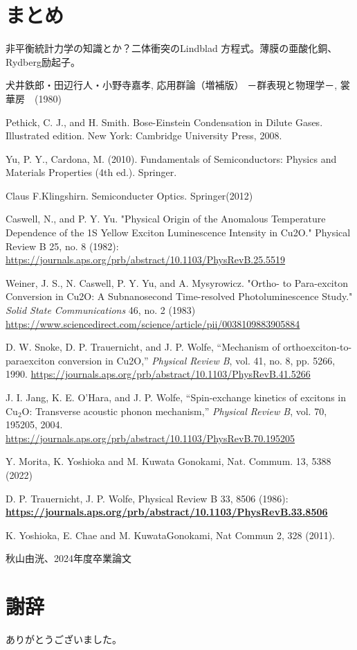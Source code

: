 \newpage
\section{まとめ}
非平衡統計力学の知識とか？二体衝突のLindblad 方程式。薄膜の亜酸化銅、Rydberg励起子。
\newpage


\begin{thebibliography}{9}

犬井鉄郎・田辺行人・小野寺嘉孝, 応用群論（増補版） －群表現と物理学－, 裳華房　(1980)

Pethick, C. J., and H. Smith. Bose-Einstein Condensation in Dilute Gases. Illustrated edition. New York: Cambridge University Press, 2008.

Yu, P. Y.,  Cardona, M. (2010). Fundamentals of Semiconductors: Physics and Materials Properties (4th ed.). Springer.

Claus F.Klingshirn. Semiconducter Optics. Springer(2012)

Caswell, N., and P. Y. Yu. "Physical Origin of the Anomalous Temperature Dependence of the 1S Yellow Exciton Luminescence Intensity in Cu2O." Physical Review B 25, no. 8 (1982): 
\href{https://journals.aps.org/prb/abstract/10.1103/PhysRevB.25.5519}{https://journals.aps.org/prb/abstract/10.1103/PhysRevB.25.5519}

Weiner, J. S., N. Caswell, P. Y. Yu, and A. Mysyrowicz. "Ortho- to Para-exciton Conversion in Cu2O: A Subnanosecond Time-resolved Photoluminescence Study." \textit{Solid State Communications} 46, no. 2 (1983)
\href{https://www.sciencedirect.com/science/article/pii/0038109883905884}{https://www.sciencedirect.com/science/article/pii/0038109883905884}

D. W. Snoke, D. P. Trauernicht, and J. P. Wolfe,
``Mechanism of orthoexciton-to-paraexciton conversion in Cu2O,''
\textit{Physical Review B}, vol. 41, no. 8, pp. 5266, 1990.
\href{https://journals.aps.org/prb/abstract/10.1103/PhysRevB.41.5266}{https://journals.aps.org/prb/abstract/10.1103/PhysRevB.41.5266}

J. I. Jang, K. E. O’Hara, and J. P. Wolfe,
``Spin-exchange kinetics of excitons in Cu$_2$O: Transverse acoustic phonon mechanism,''
\textit{Physical Review B}, vol. 70, 195205, 2004.
\href{https://journals.aps.org/prb/abstract/10.1103/PhysRevB.70.195205}{https://journals.aps.org/prb/abstract/10.1103/PhysRevB.70.195205}

Y. Morita, K. Yoshioka and M. Kuwata
Gonokami, Nat. Commum. 13, 5388 (2022)

D. P. Trauernicht, J. P. Wolfe,  Physical Review B 33, 8506 (1986): 
\href{https://journals.aps.org/prb/abstract/10.1103/PhysRevB.33.8506}{\textbf{https://journals.aps.org/prb/abstract/10.1103/PhysRevB.33.8506}}


K. Yoshioka, E. Chae and M. KuwataGonokami, Nat Commun 2, 328 (2011).

秋山由洸、2024年度卒業論文
\end{thebibliography}

\newpage
\section{謝辞}
ありがとうございました。

